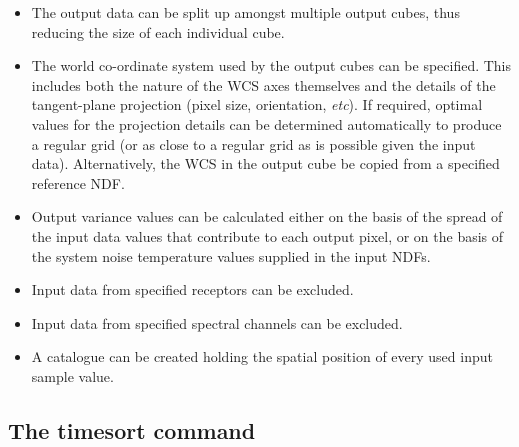 \documentclass[twoside,11pt]{article}
\renewcommand{\_}{\texttt{\symbol{95}}}
\begin{document}
\begin{itemize}

\item The output data can be split up amongst multiple output cubes, thus
reducing the size of each individual cube.

\item The world co-ordinate system used by the output cubes can be
specified. This includes both the nature of the WCS axes themselves and
the details of the tangent-plane projection (pixel size, orientation,
{\em etc}). If required, optimal values for the projection details can be
determined automatically to produce a regular grid (or as close to a
regular grid as is possible given the input data). Alternatively, the WCS
in the output cube be copied from a specified reference NDF.

\item Output variance values can be calculated either on the basis
of the spread of the input data values that contribute to each output pixel,
or on the basis of the system noise temperature values supplied in the
input NDFs.

\item Input data from specified receptors can be excluded.

\item Input data from specified spectral channels can be excluded.

\item A catalogue can be created holding the spatial position of every
used input sample value.

\end{itemize}

\subsection{The timesort command}
\end{document}
